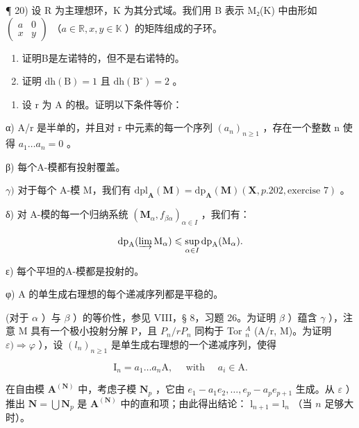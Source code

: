 ¶ 20) 设 R 为主理想环，K 为其分式域。我们用 B 表示 M₂(K) 中由形如 \(\begin{pmatrix} a & 0 \\ x & y \end{pmatrix}\) （\(a \in \mathbb{R}, x, y \in \mathbb{K}\) ）的矩阵组成的子环。

\begin{enumerate}
\def\labelenumi{\alph{enumi})}
\item
  证明B是左诺特的，但不是右诺特的。
\item
  证明 \(\mathrm{dh(B)} = 1\) 且 \(\mathrm{dh(B^{\circ})} = 2\) 。
\end{enumerate}

\begin{enumerate}
\def\labelenumi{\arabic{enumi})}
\setcounter{enumi}{20}
\tightlist
\item
  设 r 为 A 的根。证明以下条件等价：
\end{enumerate}

α) A/r 是半单的，并且对 r 中元素的每一个序列 \((a_{n})_{n\geq1}\) ，存在一个整数 n 使得 \(a_{1}\ldots a_{n}=0\) 。

β) 每个A-模都有投射覆盖。

\(\gamma)\) 对于每个 A-模 M，我们有 \(\mathrm{dpl}_{\mathbf{A}}(\mathbf{M}) = \mathrm{dp}_{\mathbf{A}}(\mathbf{M})(\mathbf{X}, p. 202, \text{exercise } 7)\) 。

δ) 对 A-模的每一个归纳系统 \((\mathbf{M}_{\alpha}, f_{\beta\alpha})_{\alpha \in I}\) ，我们有：

\[
\mathrm{dp} _ {\mathrm{A}} (\varinjlim \mathrm{M} _ {\alpha}) \leqslant \sup _ {\alpha \in I} \mathrm{dp} _ {\mathrm{A}} (\mathrm{M} _ {\alpha}).
\]

ε) 每个平坦的A-模都是投射的。

φ) A 的单生成右理想的每个递减序列都是平稳的。

(对于 \(\alpha\) ）与 \(\beta\) ）的等价性，参见 VIII，§ 8，习题 26。为证明 \(\beta\) ）蕴含 \(\gamma\) ），注意 M 具有一个极小投射分解 P，且 \(P_n/rP_n\) 同构于 Tor \(_n^A\) (A/r, M)。为证明 \(\varepsilon) \Rightarrow \varphi\) ），设 \((l_n)_{n \geq 1}\) 是单生成右理想的一个递减序列，使得

\[
\mathrm{I} _ {n} = a _ {1} \dots a _ {n} \mathrm{A}, \quad \text { with } \quad a _ {i} \in \mathrm{A}.
\]

在自由模 \(\mathbf{A}^{(\mathbf{N})}\) 中，考虑子模 \(\mathbf{N}_p\) ，它由 \(e_1 - a_1 e_2, \ldots, e_p - a_p e_{p+1}\) 生成。从 \(\varepsilon\) ）推出 \(\mathbf{N} = \bigcup \mathbf{N}_p\) 是 \(\mathbf{A}^{(\mathbf{N})}\) 中的直和项；由此得出结论： \(\mathrm{l}_{n+1} = \mathrm{l}_n\) （当 \(n\) 足够大时）。

